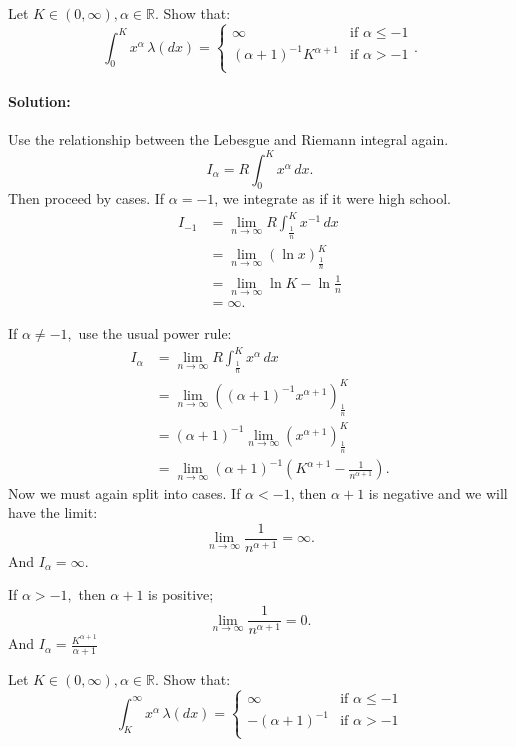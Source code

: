 \documentclass{article}
\begin{document}
\begin{exe}
    Let $K\in (0,\infty),\alpha\in \mathbb{R}$. Show that:
    \[
    \int_{0}^{K} x^{\alpha}\,\lambda(  d x )=
    \begin{cases}
        \infty&\text{if }\alpha\leq -1\\
        (\alpha+1)^{-1}K^{\alpha+1}&\text{if }\alpha> -1\\
    \end{cases}
    .\] 

\end{exe}
\paragraph{Solution: }
Use the relationship between the Lebesgue and Riemann integral again.
\[
    I_\alpha=R \int_{0}^{K}x^{\alpha}  \, d x 
.\] 
Then proceed by cases. If $\alpha=-1$, we integrate as if it were high school.
\begin{align*}
    I_{-1}&=\lim_{n\to\infty}R \int_{\frac{1}{n}}^{K}x^{-1}  \, d x \\
    &= \lim_{n\to\infty} \left( \ln x \right) _{\frac{1}{n}}^{K} \\
    &= \lim_{n\to\infty} \ln K-\ln \frac{1}{n} \\
    &=\infty
.\end{align*}

If $\alpha\neq -1,$ use the usual power rule:
\begin{align*}
    I_\alpha&=\lim_{n\to\infty} R \int_{\frac{1}{n}}^{K} x^{\alpha} \, d x \\
    &=\lim_{n\to\infty}  \left(\left( \alpha+1 \right) ^{-1}x^{\alpha+1} \right)_{\frac{1}{n}}^{K}\\
    &=(\alpha+1)^{-1}\lim_{n\to\infty} \left( x^{\alpha+1} \right) ^{K}_{\frac{1}{n}}\\
    &=\lim_{n\to\infty} (\alpha+1)^{-1}\left( K^{\alpha+1}-\frac{1}{n^{\alpha+1}} \right) 
.\end{align*}
Now we must again split into cases. If $\alpha<-1$, then $\alpha+1$ is negative and we will have the limit:
\[
    \lim_{n\to\infty} \frac{1}{n^{\alpha+1}}=\infty
.\] 
And $I_\alpha=\infty$.

If $\alpha>-1, $ then $\alpha+1$ is positive;
\[
    \lim_{n\to\infty} \frac{1}{n^{\alpha+1}}=0
.\] 
And $I_\alpha=\frac{K^{\alpha+1}}{\alpha+1}$

\newpage
\begin{exe}

    Let $K\in (0,\infty),\alpha\in \mathbb{R}$. Show that:
    \[
    \int_{K}^{\infty} x^{\alpha}\,\lambda(  d x )=
    \begin{cases}
        \infty&\text{if }\alpha\leq -1\\
        -(\alpha+1)^{-1}&\text{if }\alpha> -1\\
    \end{cases}
    \] 


\end{exe}
\end{document}
